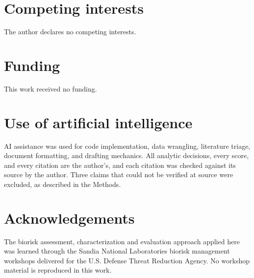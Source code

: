 \section*{Competing interests}

The author declares no competing interests.

\section*{Funding}

This work received no funding.

\section*{Use of artificial intelligence}

AI assistance was used for code implementation, data wrangling, literature triage,
document formatting, and drafting mechanics. All analytic decisions, every score, and
every citation are the author's, and each citation was checked against its source by the
author. Three claims that could not be verified at source were excluded, as described in
the Methods.

\section*{Acknowledgements}

The biorisk assessment, characterization and evaluation approach applied here was learned
through the Sandia National Laboratories biorisk management workshops delivered for the
U.S. Defense Threat Reduction Agency. No workshop material is reproduced in this work.
